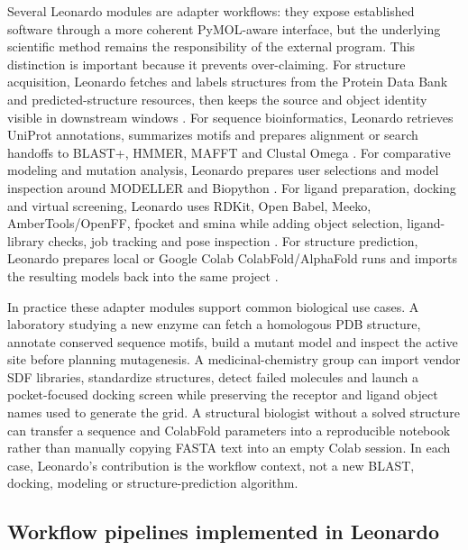 \documentclass[pdflatex,sn-vancouver-num]{sn-jnl}
\begin{document}
Several Leonardo modules are adapter workflows: they expose established software through a more coherent PyMOL-aware interface, but the underlying scientific method remains the responsibility of the external program.  This distinction is important because it prevents over-claiming.  For structure acquisition, Leonardo fetches and labels structures from the Protein Data Bank and predicted-structure resources, then keeps the source and object identity visible in downstream windows \cite{pdb2000,alphafold2021}.  For sequence bioinformatics, Leonardo retrieves UniProt annotations, summarizes motifs and prepares alignment or search handoffs to BLAST+, HMMER, MAFFT and Clustal Omega \cite{uniprot2025,blastplus2009,hmmer2011,mafft2013,clustalo2011}.  For comparative modeling and mutation analysis, Leonardo prepares user selections and model inspection around MODELLER and Biopython \cite{modeller1993,biopython2009}.  For ligand preparation, docking and virtual screening, Leonardo uses RDKit, Open Babel, Meeko, AmberTools/OpenFF, fpocket and smina while adding object selection, ligand-library checks, job tracking and pose inspection \cite{rdkit,openbabel2011,meeko,ambertools,openff2018,fpocket2009,smina2013}.  For structure prediction, Leonardo prepares local or Google Colab ColabFold/AlphaFold runs and imports the resulting models back into the same project \cite{alphafold2021,colabfold2022}.

In practice these adapter modules support common biological use cases.  A laboratory studying a new enzyme can fetch a homologous PDB structure, annotate conserved sequence motifs, build a mutant model and inspect the active site before planning mutagenesis.  A medicinal-chemistry group can import vendor SDF libraries, standardize structures, detect failed molecules and launch a pocket-focused docking screen while preserving the receptor and ligand object names used to generate the grid.  A structural biologist without a solved structure can transfer a sequence and ColabFold parameters into a reproducible notebook rather than manually copying FASTA text into an empty Colab session.  In each case, Leonardo's contribution is the workflow context, not a new BLAST, docking, modeling or structure-prediction algorithm.

\subsection{Workflow pipelines implemented in Leonardo}
\end{document}
